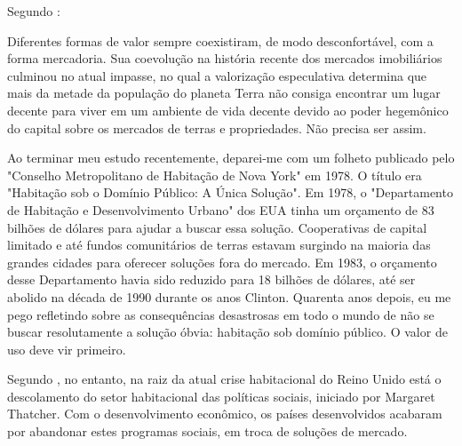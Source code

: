 \documentclass[
	12pt,				%
	oneside,			%
	a4paper,			%
	chapter=TITLE,		%
	section=TITLE,		%
	english,			%
	brazil				%
	]{abntex2}
\begin{document}
\begin{refsection}
Segundo \textcite{terraredonda}:
\begin{citacao}
Diferentes formas de valor sempre coexistiram, de modo desconfortável, com a
forma mercadoria. Sua coevolução na história recente dos mercados imobiliários
culminou no atual impasse, no qual a valorização especulativa determina que mais
da metade da população do planeta Terra não consiga encontrar um lugar decente
para viver em um ambiente de vida decente devido ao poder hegemônico do capital
sobre os mercados de terras e propriedades. Não precisa ser assim.

Ao terminar meu estudo recentemente, deparei-me com um folheto publicado pelo
"Conselho Metropolitano de Habitação de Nova York" em 1978. O título era
"Habitação sob o Domínio Público: A Única Solução". Em 1978, o "Departamento de
Habitação e Desenvolvimento Urbano" dos \gls{EUA} tinha um orçamento de 83
bilhões de dólares para ajudar a buscar essa solução. Cooperativas de capital
limitado e até fundos comunitários de terras estavam surgindo na maioria das
grandes cidades para oferecer soluções fora do mercado. Em 1983, o orçamento
desse Departamento havia sido reduzido para 18 bilhões de dólares, até ser
abolido na década de 1990 durante os anos Clinton. Quarenta anos depois, eu me
pego refletindo sobre as consequências desastrosas em todo o mundo de não se
buscar resolutamente a solução óbvia: habitação sob domínio público. O valor de
uso deve vir primeiro.
\end{citacao}
Segundo \textcite{rolnik}, no entanto, na raiz da atual crise habitacional do Reino Unido
está o descolamento do setor habitacional das políticas sociais, iniciado por
Margaret Thatcher. Com o desenvolvimento econômico, os países desenvolvidos
acabaram por abandonar estes programas sociais, em troca de soluções de
mercado.


\end{refsection}
\end{document}
